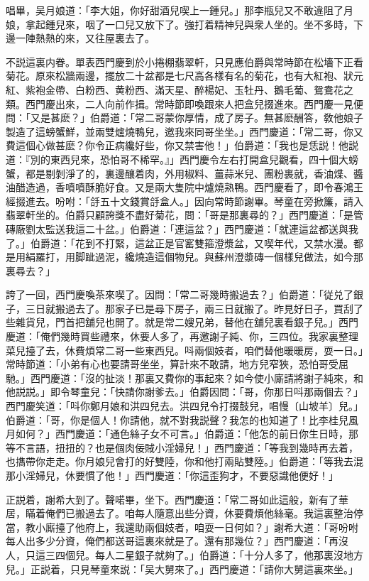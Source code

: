 唱畢，吴月娘道：「李大姐，你好甜酒兒喫上一鍾兒。」那李瓶兒又不敢違阻了月娘，拿起鍾兒來，咽了一口兒又放下了。強打着精神兒與衆人坐的。坐不多時，下邊一陣熱熱的來，又往屋裏去了。

不説這裏内眷。單表西門慶到於小捲棚翡翠軒，只見應伯爵與常時節在松墻下正看菊花。原來松牆兩邊，擺放二十盆都是七尺高各樣有名的菊花，也有大紅袍、狀元紅、紫袍金帶、白粉西、黄粉西、滿天星、醉楊妃、玉牡丹、鵝毛葡、鴛鴦花之類。西門慶出來，二人向前作揖。常時節即喚跟來人把盒兒掇進來。西門慶一見便問：「又是甚麽？」伯爵道：「常二哥蒙你厚情，成了房子。無甚麽酬答，敎他娘子製造了這螃蟹鮮，並兩雙爐燒鴨兒，邀我來同哥坐坐。」西門慶道：「常二哥，你又費這個心做甚麽？你令正病纔好些，你又禁害他！」伯爵道：「我也是恁説！他説道：『別的東西兒來，恐怕哥不稀罕。』」西門慶令左右打開盒兒觀看，四十個大螃蟹，都是剔剝淨了的，裏邊釀着肉，外用椒料、薑蒜米兒、團粉裹就，香油煠、醬油醋造過，香噴噴酥脆好食。又是兩大隻院中爐燒熟鴨。西門慶看了，即令春鴻王經掇進去。吩咐：「㧱五十文錢賞㧱盒人。」因向常時節謝畢。琴童在旁掀簾，請入翡翠軒坐的。伯爵只顧誇獎不盡好菊花，問：「哥是那裏尋的？」西門慶道：「是管磚廠劉太監送我這二十盆。」伯爵道：「連這盆？」西門慶道：「就連這盆都送與我了。」伯爵道：「花到不打緊，這盆正是官窰雙箍澄漿盆，又喫年代，又禁水漫。都是用絹羅打，用脚跐過泥，纔燒造這個物兒。與蘇州澄漿磚一個樣兒做法，如今那裏尋去？」

誇了一回，西門慶喚茶來喫了。因問：「常二哥幾時搬過去？」伯爵道：「従兑了銀子，三日就搬過去了。那家子已是尋下房子，兩三日就搬了。昨見好日子，買刮了些雜貨兒，門首把舖兒也開了。就是常二嫂兄弟，替他在舖兒裏看銀子兒。」西門慶道：「俺們幾時買些禮來，休要人多了，再邀謝子純、你，三四位。我家裏整理菜兒擡了去，休費煩常二哥一些東西兒。呌兩個妓者，咱們替他暖暖房，耍一日。」常時節道：「小弟有心也要請哥坐坐，算計來不敢請，地方兒窄狹，恐怕哥受屈馳。」西門慶道：「沒的扯淡！那裏又費你的事起來？如今使小廝請將謝子純來，和他説説。」即令琴童兒：「快請你謝爹去。」伯爵因問：「哥，你那日呌那兩個去？」西門慶笑道：「呌你鄭月娘和洪四兒去。洪四兒令打掇鼓兒，唱慢〔山坡羊〕兒。」伯爵道：「哥，你是個人！你請他，就不對我説聲？我怎的也知道了！比李桂兒風月如何？」西門慶道：「通色絲子女不可言。」伯爵道：「他怎的前日你生日時，那等不言語，扭扭的？也是個肉佞賊小淫婦兒！」西門慶道：「等我到幾時再去着，也㩦帶你走走。你月娘兒會打的好雙陸，你和他打兩貼雙陸。」伯爵道：「等我去混那小淫婦兒，休要慣了他！」西門慶道：「你這歪狗才，不要惡識他便好！」

正説着，謝希大到了。聲喏畢，坐下。西門慶道：「常二哥如此這般，新有了華居，瞞着俺們已搬過去了。咱每人隨意出些分資，休要費煩他絲毫。我這裏整治停當，教小廝擡了他府上，我還助兩個妓者，咱耍一日何如？」謝希大道：「哥吩咐每人出多少分資，俺們都送哥這裏來就是了。還有那幾位？」西門慶道：「再沒人，只這三四個兒。每人二星銀子就夠了。」伯爵道：「十分人多了，他那裏沒地方兒。」正説着，只見琴童來説：「吴大舅來了。」西門慶道：「請你大舅這裏來坐。」

